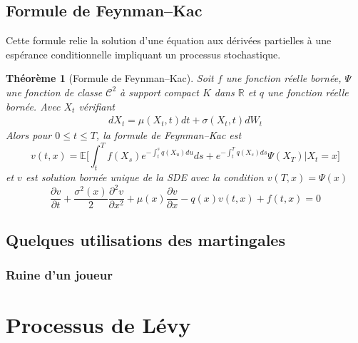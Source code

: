 \documentclass[a4paper]{article}
\newtheorem{theorem}{Théorème}[section]
\begin{document}
\subsection{Formule de Feynman--Kac}
Cette formule relie la solution d'une équation aux dérivées partielles à une espérance conditionnelle impliquant un processus stochastique. 
\begin{theorem}[Formule de Feynman--Kac]
Soit $f$ une fonction réelle bornée, $\Psi$ une fonction de classe $\mathcal{C}^2$ à support compact $K$ dans $\mathbb{R}$ et $q$ une fonction réelle bornée. Avec $X_t$ vérifiant
\begin{align*}
    dX_t = \mu(X_t,t) dt + \sigma(X_t, t) dW_t
\end{align*}
Alors pour $0 \leq t \leq T$, la formule de Feynman--Kac est
\begin{equation}
    v(t,x) = \mathbb{E} \bigg[ \int_{t}^{T} f(X_s)e^{-\int_{t}^{s} q(X_u)du} ds + e^{-\int_{t}^{T} q(X_s)ds} \Psi(X_T) | X_t=x \bigg]
\end{equation}
et $v$ est solution bornée unique de la SDE avec la condition $v(T,x)=\Psi(x)$
\begin{equation}
    \frac{\partial v}{\partial t} + \frac{\sigma^2(x)}{2} \frac{\partial^2 v}{\partial x^2} + \mu(x) \frac{\partial v}{\partial x} -q(x)v(t,x) + f(t,x) =0
\end{equation}
\end{theorem}

\subsection{Quelques utilisations des martingales}
\subsubsection{Ruine d'un joueur}



\section{Processus de Lévy}
\end{document}
